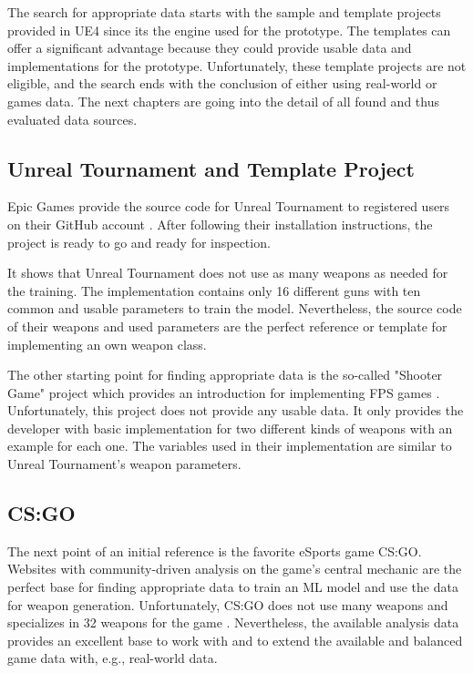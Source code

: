 \documentclass[MGS,Master,english]{twbook}%
\begin{document}
The search for appropriate data starts with the sample and template projects provided in \ac{UE4} since its the engine used for the prototype. The templates can offer a significant advantage because they could provide usable data and implementations for the prototype. Unfortunately, these template projects are not eligible, and the search ends with the conclusion of either using real-world or games data. The next chapters are going into the detail of all found and thus evaluated data sources.

\subsection{Unreal Tournament and Template Project}
Epic Games provide the source code for Unreal Tournament to registered users on their GitHub account \cite{epicGames::unrealTournamentSourceCode}. After following their installation instructions, the project is ready to go and ready for inspection.

It shows that Unreal Tournament does not use as many weapons as needed for the training. The implementation contains only 16 different guns with ten common and usable parameters to train the model. Nevertheless, the source code of their weapons and used parameters are the perfect reference or template for implementing an own weapon class.

The other starting point for finding appropriate data is the so-called "Shooter Game" project which provides an introduction for implementing \ac{FPS} games \cite{epicGames::shooterGame}. Unfortunately, this project does not provide any usable data. It only provides the developer with basic implementation for two different kinds of weapons with an example for each one. The variables used in their implementation are similar to Unreal Tournament’s weapon parameters.

\subsection{\acl{CS:GO}}
The next point of an initial reference is the favorite eSports game \ac{CS:GO}. Websites with community-driven analysis on the game's central mechanic are the perfect base for finding appropriate data to train an \ac{ML} model and use the data for weapon generation. Unfortunately, \ac{CS:GO} does not use many weapons and specializes in 32 weapons for the game \cite{counterstrike::wikiWeapons}. Nevertheless, the available analysis data provides an excellent base to work with and to extend the available and balanced game data with, e.g., real-world data.
\end{document}
